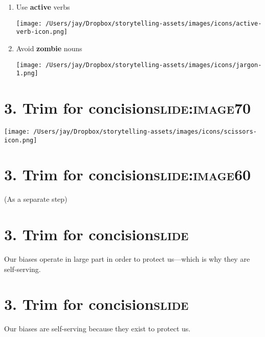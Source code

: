 \documentclass[12pt]{article}
\begin{document}
\begin{enumerate}
\item Use \textbf{active} verbs \begin{center}
\texttt{[image: /Users/jay/Dropbox/storytelling-assets/images/icons/active-verb-icon.png]}
\end{center}
\item Avoid \textbf{zombie} nouns \begin{center}
\texttt{[image: /Users/jay/Dropbox/storytelling-assets/images/icons/jargon-1.png]}
\end{center}
\end{enumerate}

\section[3. Trim for \textbf{concision}]{3. Trim for \textbf{concision}\hfill{}\textsc{slide:image70}}
\label{sec:org0bc98ca}
\begin{center}
\texttt{[image: /Users/jay/Dropbox/storytelling-assets/images/icons/scissors-icon.png]}
\end{center}

\section[3. Trim for \textbf{concision}]{3. Trim for \textbf{concision}\hfill{}\textsc{slide:image60}}
\label{sec:org5bc633b}
(As a separate step)

\section[3. Trim for \textbf{concision}]{3. Trim for \textbf{concision}\hfill{}\textsc{slide}}
\label{sec:orgfe0bb80}
Our biases operate in large part in order to protect us---which is why they are self-serving.

\section[3. Trim for \textbf{concision}]{3. Trim for \textbf{concision}\hfill{}\textsc{slide}}
\label{sec:org8ba910f}
Our biases are self-serving because they exist to protect us.
\end{document}
